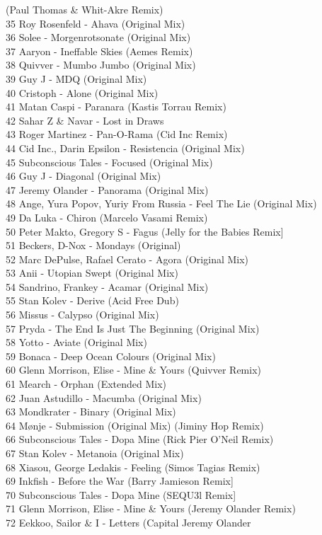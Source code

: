 \begin{multicols}{2}
(Paul Thomas \& Whit-Akre Remix)\\ 35 Roy Rosenfeld - Ahava (Original Mix)\\ 36 Solee - Morgenrotsonate (Original Mix)\\ 37 Aaryon - Ineffable Skies (Aemes Remix)\\ 38 Quivver - Mumbo Jumbo (Original Mix)\\ 39 Guy J - MDQ (Original Mix)\\ 40 Cristoph - Alone (Original Mix)\\ 41 Matan Caspi - Paranara (Kastis Torrau Remix)\\ 42 Sahar Z \& Navar - Lost in Draws\\ 43 Roger Martinez - Pan-O-Rama (Cid Inc Remix)\\ 44 Cid Inc., Darin Epsilon - Resistencia (Original Mix)\\ 45 Subconscious Tales - Focused (Original Mix)\\ 46 Guy J - Diagonal (Original Mix)\\ 47 Jeremy Olander - Panorama (Original Mix)\\ 48 Ange, Yura Popov, Yuriy From Russia - Feel The Lie (Original Mix)\\ 49 Da Luka - Chiron (Marcelo Vasami Remix)\\ 50 Peter Makto, Gregory S - Fagus (Jelly for the Babies Remix]\\ 51 Beckers, D-Nox - Mondays (Original)\\ 52 Marc DePulse, Rafael Cerato - Agora (Original Mix)\\ 53 Anii - Utopian Swept (Original Mix)\\ 54 Sandrino, Frankey - Acamar (Original Mix)\\ 55 Stan Kolev - Derive (Acid Free Dub)\\ 56 Missus - Calypso (Original Mix)\\ 57 Pryda - The End Is Just The Beginning (Original Mix)\\ 58 Yotto - Aviate (Original Mix)\\ 59 Bonaca - Deep Ocean Colours (Original Mix)\\ 60 Glenn Morrison, Elise - Mine \& Yours (Quivver Remix)\\ 61 Mearch - Orphan (Extended Mix)\\ 62 Juan Astudillo - Macumba (Original Mix)\\ 63 Mondkrater - Binary (Original Mix)\\ 64 Mønje - Submission (Original Mix) (Jiminy Hop Remix)\\ 66 Subconscious Tales - Dopa Mine (Rick Pier O'Neil Remix)\\ 67 Stan Kolev - Metanoia (Original Mix)\\ 68 Xiasou, George Ledakis - Feeling (Simos Tagias Remix)\\ 69 Inkfish - Before the War (Barry Jamieson Remix]\\ 70 Subconscious Tales - Dopa Mine (SEQU3l Remix]\\ 71 Glenn Morrison, Elise - Mine \& Yours (Jeremy Olander Remix)\\ 72 Eekkoo, Sailor \& I - Letters (Capital Jeremy Olander 
\end{multicols}
